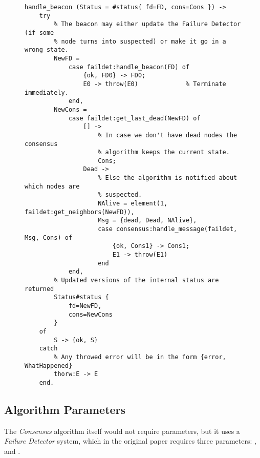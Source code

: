 \begin{itemize}
            \begin{figure}[hbt]
            \begin{lstlisting}[caption={Events from the \emph{Failure
                                        Detector}},
                               label={code:FromFaildet}]
handle_beacon (Status = #status{ fd=FD, cons=Cons }) ->
    try
        % The beacon may either update the Failure Detector (if some
        % node turns into suspected) or make it go in a wrong state.
        NewFD =
            case faildet:handle_beacon(FD) of
                {ok, FD0} -> FD0;
                E0 -> throw(E0)             % Terminate immediately.
            end,
        NewCons =
            case faildet:get_last_dead(NewFD) of
                [] ->
                    % In case we don't have dead nodes the consensus
                    % algorithm keeps the current state.
                    Cons;
                Dead ->
                    % Else the algorithm is notified about which nodes are
                    % suspected.
                    NAlive = element(1, faildet:get_neighbors(NewFD)),
                    Msg = {dead, Dead, NAlive},
                    case consensus:handle_message(faildet, Msg, Cons) of
                        {ok, Cons1} -> Cons1;
                        E1 -> throw(E1)
                    end
            end,
        % Updated versions of the internal status are returned
        Status#status {
            fd=NewFD,
            cons=NewCons
        }
    of
        S -> {ok, S}
    catch
        % Any throwed error will be in the form {error, WhatHappened}
        thorw:E -> E
    end.
            \end{lstlisting}
            \end{figure}

\end{itemize}


\subsection{Algorithm Parameters} \label{sub:ConsParams}

The \emph{Consensus} algorithm itself would not require parameters, but it
uses a \emph{Failure Detector} system, which in the original
paper\cite{bib:FD} requires three parameters: ,
 and .

